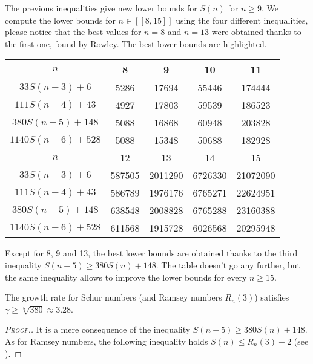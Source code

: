\par
The previous inequalities give new lower bounds for \(S(n)\) for
\( n \geqslant 9 \). We compute the lower
bounds for \( n \in [\![8,15]\!] \) using the four different inequalities, please notice that the best values for \( n
=8\) and \(n = 13\) were obtained thanks to the first one, found by Rowley. The best lower bounds are highlighted.

\begin{center}
\begin{tabular}{|*{5}{c|}}
    \hline
	\(n\) & 8 & 9 & 10 & 11 \\
	\hline
	\(33S(n-3) + 6 \) & \cellcolor{yellow} 5286 & 17694 & 55446 & 174444\\
	\hline
	\(111S(n-4) + 43 \) & 4927 & \cellcolor{yellow} 17803 & 59539 & 186523\\
	\hline
	\(380S(n-5) + 148 \) & 5088 & 16868 & \cellcolor{yellow} 60948 & \cellcolor{yellow} 203828 \\
	\hline
	\(1140S(n-6) + 528 \) & 5088 & 15348 & 50688 & 182928\\
	\hline
	\hline
	\(n\) & 12 & 13 & 14 & 15 \\
	\hline
	\(33S(n-3) + 6 \) & 587505 & \cellcolor{yellow} 2011290 & 6726330 & 21072090\\
	\hline
	\(111S(n-4) + 43 \) & 586789 & 1976176 & 6765271 & 22624951 \\
	\hline
\(380S(n-5) + 148 \) & \cellcolor{yellow} 638548 & 2008828 & \cellcolor{yellow} 6765288 & \cellcolor{yellow} 23160388 \\\hline
	\(1140S(n-6) + 528 \) & 611568 & 1915728 & 6026568 & 20295948 \\
	\hline
\end{tabular}
\end{center}

Except for 8, 9 and 13, the best lower bounds are obtained thanks to
the third inequality \( S(n+5) \geqslant 380S(n) + 148\). The table
doesn't go any further, but the same inequality allows to improve the
lower bounds for every \( n \geqslant 15 \).

\begin{corollary}
The growth rate for Schur numbers (and Ramsey numbers \(R_n(3)\))  satisfies \(\gamma \geqslant \sqrt[5]{380} \approx 3.28\).
\end{corollary}

\begin{proof}[\textsc{Proof.}]
It is a mere consequence of the inequality \( S(n+5) \geqslant 380S(n) + 148\). As for Ramsey
numbers, the following inequality holds \(S(n) \leqslant R_n(3) - 2\) (see \cite{AbbottHanson}).
\end{proof}


